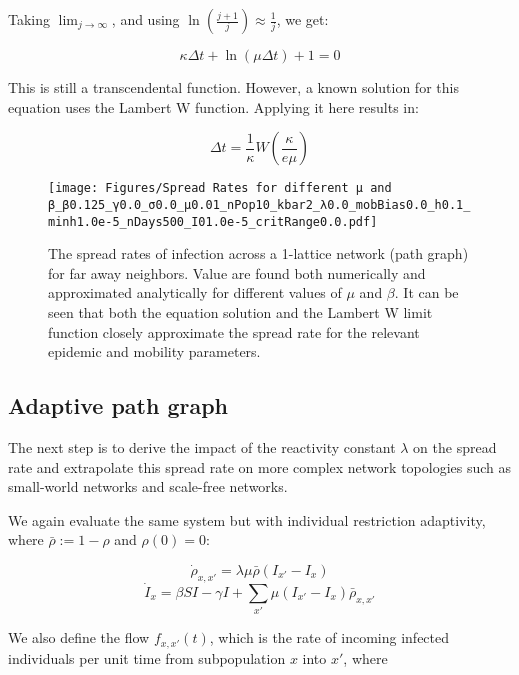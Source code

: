 Taking $\lim_{j \to \infty}$, and using $\ln\left( \frac{{j+1}}{j} \right) \approx \frac{1}{j}$, we get:

\begin{equation}
\kappa \Delta t + \ln( \mu \Delta t ) + 1 = 0
\end{equation}

This is still a transcendental function. However, a known solution for this equation uses the Lambert W function. Applying it here results in:

\begin{equation}
\Delta t = \frac{1}{\kappa} W\left(\frac{\kappa}{e \mu}\right)
\label{eq: Lambert W approximation}
\end{equation}

\begin{figure}[!ht]
    \centering
    \texttt{[image: Figures/Spread Rates for different μ and β\_β0.125\_γ0.0\_σ0.0\_μ0.01\_nPop10\_kbar2\_λ0.0\_mobBias0.0\_h0.1\_minh1.0e-5\_nDays500\_I01.0e-5\_critRange0.0.pdf]}
    \caption{\small The spread rates of infection across a 1-lattice network (path graph) for far away neighbors. Value are found both numerically and approximated analytically for different values of $\mu$ and $\beta$. It can be seen that both the equation solution and the Lambert W limit function closely approximate the spread rate for the relevant epidemic and mobility parameters.}
    \label{Spread Rates mu beta}
\end{figure}

\subsection{Adaptive path graph}
The next step is to derive the impact of the reactivity constant $\lambda$ on the spread rate and extrapolate this spread rate on more complex network topologies such as small-world networks and scale-free networks.

We again evaluate the same system but with individual restriction adaptivity, where $\bar \rho := 1 - \rho$ and $\rho(0) = 0$:

\begin{equation}
\dot \rho_{x,x'} = \lambda \mu \bar \rho (I_{x'} - I_x)
\end{equation}
\begin{equation}
\dot I_x = \beta S I - \gamma I +  \sum_{x'} \mu (I_{x'} - I_x) \bar \rho_{x,x'}
\end{equation}

We also define the flow $f_{x,x'}(t)$, which is the rate of incoming infected individuals per unit time from subpopulation $x$ into $x'$, where 

